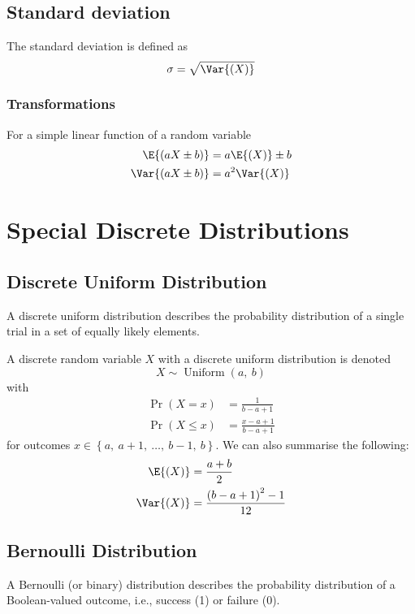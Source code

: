 \documentclass{article}
\begin{document}
\begin{multicols}{3}
    \subsection{Standard deviation}
    The standard deviation is defined as
    \begin{equation*}
        \sigma = \sqrt{\Var{\left( X \right)}}
    \end{equation*}
    \subsubsection{Transformations}
    For a simple linear function of a random variable
    \begin{align*}
        \E{\left( aX \pm b \right)}   & = a\E{\left( X \right)} \pm b \\
        \Var{\left( aX \pm b \right)} & = a^2\Var{\left( X \right)}
    \end{align*}
    \section{Special Discrete Distributions}
    \subsection{Discrete Uniform Distribution}
    A discrete uniform distribution describes the probability distribution of a single trial
    in a set of equally likely elements.

    A discrete random variable \(X\) with a discrete uniform distribution is denoted
    \begin{equation*}
        X \sim \operatorname{Uniform}{\left( a,\: b \right)}
    \end{equation*}
    with
    \begin{align*}
        \Pr{\left( X = x \right)}    & = \frac{1}{b - a + 1}         \\
        \Pr{\left( X \leq x \right)} & = \frac{x - a + 1}{b - a + 1}
    \end{align*}
    for outcomes \(x \in \left\{ a,\: a + 1,\: \dots,\: b - 1,\: b \right\}\).
    We can also summarise the following:
    \begin{align*}
        \E{\left( X \right)}   & = \frac{a + b}{2}                           \\
        \Var{\left( X \right)} & = \frac{\left( b - a + 1 \right)^2 - 1}{12}
    \end{align*}
    \subsection{Bernoulli Distribution}
    A Bernoulli (or binary) distribution describes the probability distribution of a Boolean-valued
    outcome, i.e., success (1) or failure (0).


\end{multicols}
\end{document}
